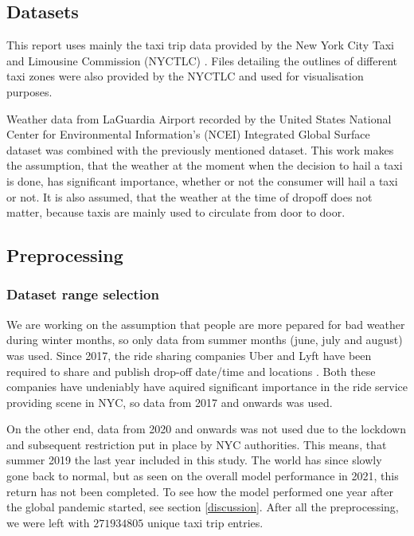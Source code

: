 \documentclass[11pt]{article}
\begin{document}
\subsection{Datasets}
This report uses mainly the taxi trip data provided by the New York City Taxi and Limousine Commission (NYCTLC) \cite{nyctlcData}. Files detailing the outlines of different taxi zones were also provided by the NYCTLC and used for visualisation purposes.

Weather data from LaGuardia Airport recorded by the United States National Center for Environmental Information's (NCEI) Integrated Global Surface dataset \cite{weatherData} was combined with the previously mentioned dataset. This work makes the assumption, that the weather at the moment when the decision to hail a taxi is done, has significant importance, whether or not the consumer will hail a taxi or not. It is also assumed, that the weather at the time of dropoff does not matter, because taxis are mainly used to circulate from door to door.

\subsection{Preprocessing}

\subsubsection{Dataset range selection}

We are working on the assumption that people are more pepared for bad weather during winter months, so only data from summer months (june, july and august) was used. Since 2017, the ride sharing companies Uber and Lyft have been required to share and publish drop-off date/time and locations \cite{tripUserGuide}. Both these companies have undeniably have aquired significant importance in the ride service providing scene in NYC, so data from 2017 and onwards was used. 

On the other end, data from 2020 and onwards was not used due to the lockdown and subsequent restriction put in place by NYC authorities. This means, that summer 2019 the last year included in this study. The world has since slowly gone back to normal, but as seen on the overall model performance in 2021, this return has not been completed. To see how the model performed one year after the global pandemic started, see section \ref{discussion}. After all the preprocessing, we were left with $271934805$ unique taxi trip entries.
\end{document}
